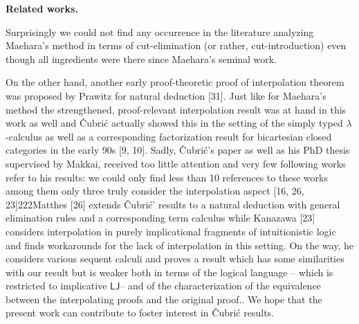 \documentclass[10pt,a4paper]{article}
\begin{document}
 
 
 
\par\medskip\noindent\textbf{Related works.}\par
 
 
Surprisingly we could not find any occurrence in the literature analyzing Maehara’s method in terms of cut-elimination (or rather, cut-introduction) even though all ingredients were there since Maehara’s seminal work.\par
 
 
 
On the other hand, another early proof-theoretic proof of interpolation theorem was proposed by Prawitz for natural deduction [31]. Just like for Maehara’s method the strengthened, proof-relevant interpolation result was at hand in this work as well and Čubrić actually showed this in the setting of the simply typed $\lambda$-calculus as well as a corresponding factorization result for bicartesian closed categories in the early 90s [9, 10]. Sadly, Čubrić’s paper as well as his PhD thesis supervised by Makkai, received too little attention and very few following works refer to his results: we could only find less than 10 references to these works among them only three truly consider the interpolation aspect [16, 26, 23]222Matthes [26] extends Čubrić’ results to a natural deduction with general elimination rules and a corresponding term calculus while Kanazawa [23] considers interpolation in purely implicational fragments of intuitionistic logic and finds workarounds for the lack of interpolation in this setting. On the way, he considers various sequent calculi and proves a result which has some similarities with our result but is weaker both in terms of the logical language – which is restricted to implicative $\mathsf{LJ}$– and of the characterization of the equivalence between the interpolating proofs and the original proof.. We hope that the present work can contribute to foster interest in Čubrić results.\par
 
 
 
\end{document}
